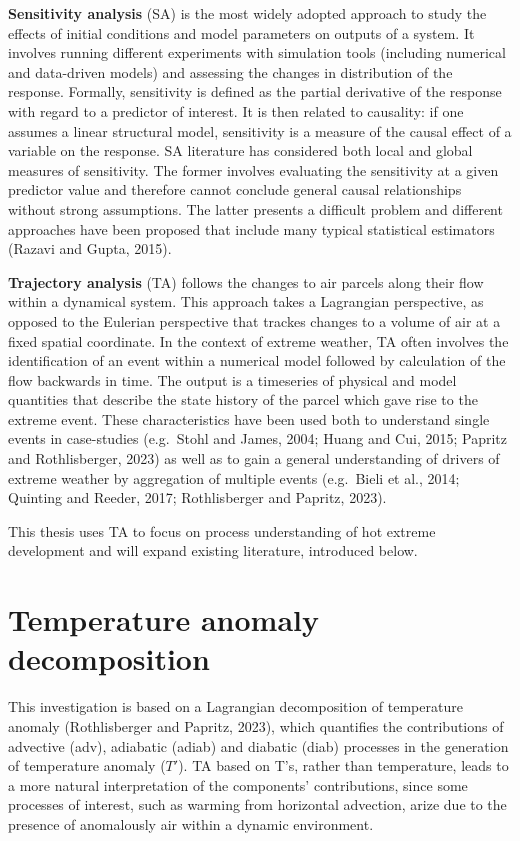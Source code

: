 \documentclass[11pt,a4paper,twoside,openright]{report}
\theoremstyle{definition}
\begin{document}
\textbf{Sensitivity analysis} (SA) is the most widely adopted approach to study the effects of initial conditions and model parameters on outputs of a system. It involves running different experiments with simulation tools (including numerical and data-driven models) and assessing the changes in distribution of the response. Formally, sensitivity is defined as the partial derivative of the response with regard to a predictor of interest. It is then related to causality: if one assumes a linear structural model, sensitivity is a measure of the causal effect of a variable on the response. SA literature has considered both local and global measures of sensitivity. The former involves evaluating the sensitivity at a given predictor value and therefore cannot conclude general causal relationships without strong assumptions. The latter presents a difficult problem and different approaches have been proposed that include many typical statistical estimators (Razavi and Gupta, 2015).

\textbf{Trajectory analysis} (TA) follows the changes to air parcels along their flow within a dynamical system. This approach takes a Lagrangian perspective, as opposed to the Eulerian perspective that trackes changes to a volume of air at a fixed spatial coordinate. In the context of extreme weather, TA often involves the identification of an event within a numerical model followed by calculation of the flow backwards in time. The output is a timeseries of physical and model quantities that describe the state history of the parcel which gave rise to the extreme event. These characteristics have been used both to understand single events in case-studies (e.g.~Stohl and James, 2004; Huang and Cui, 2015; Papritz and Rothlisberger, 2023) as well as to gain a general understanding of drivers of extreme weather by aggregation of multiple events (e.g.~Bieli et al., 2014; Quinting and Reeder, 2017; Rothlisberger and Papritz, 2023).

This thesis uses TA to focus on process understanding of hot extreme development and will expand existing literature, introduced below.

\section{Temperature anomaly decomposition}\label{temperature-anomaly-decomposition}

This investigation is based on a Lagrangian decomposition of temperature anomaly (Rothlisberger and Papritz, 2023), which quantifies the contributions of advective (adv), adiabatic (adiab) and diabatic (diab) processes in the generation of temperature anomaly (\(T'\)). TA based on T's, rather than temperature, leads to a more natural interpretation of the components' contributions, since some processes of interest, such as warming from horizontal advection, arize due to the presence of anomalously air within a dynamic environment.
\end{document}

